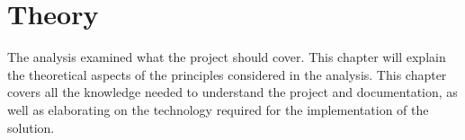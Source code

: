 \chapter{Theory}

The analysis examined what the project should cover.
This chapter will explain the theoretical aspects of the principles considered in the analysis.
This chapter covers all the knowledge needed to understand the project and documentation, as well as elaborating on the technology required for the implementation of the solution.




